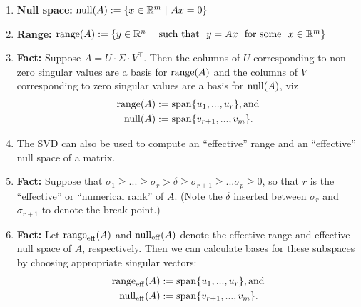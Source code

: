 \begin{tcolorbox}[title=\textbf{Other Interesting and Useful Facts}]
\begin{enumerate}
\setlength{\itemsep}{.2cm}
\renewcommand{\labelenumi}{(\alph{enumi})}

\item \textbf{Null space:} $\mathrm{null}(A):=\{ x\in \mathbb R^m~|~ Ax = 0\}$


\item \textbf{Range:} $\mathrm{range}(A):=\{ y\in \mathbb R^n~|~~\text{such that}~~ y = Ax~~\text{for some}~~x \in \mathbb R^m \}$


 \item \textbf{Fact:} Suppose $A = U \cdot \Sigma \cdot V^\top$. Then the columns of $U$ corresponding to non-zero singular values are a basis for $\mathrm{range}(A)$ and the columns of $V$ corresponding to zero singular values are a basis for $\mathrm{null}(A)$, viz
 \begin{align*}
    \mathrm{range}(A) &:= \mathrm{span} \{ u_1, ..., u_r \}, \text{and}\\
    \mathrm{null}(A) &:= \mathrm{span} \{ v_{r+1}, ..., v_m \}.
\end{align*}

\item The SVD can also be used to compute an ``effective'' range and an ``effective'' null space of a matrix.

\item \textbf{Fact:} Suppose that $\sigma_1 \geq ... \geq \sigma_r > \delta \ge  \sigma_{r+1} \geq ... \sigma_p \geq 0$, so that $r$ is the ``effective'' or ``numerical rank'' of $A$. (Note the $\delta$ inserted between $\sigma_r$ and $\sigma_{r+1}$ to denote the break point.)

\item \textbf{Fact:} Let $\mathrm{range}_{\rm eff}(A)$ and $\mathrm{null}_{\rm eff}(A)$ denote the effective range and effective null space of $A$, respectively. Then we can calculate bases for these subspaces by choosing appropriate singular vectors:
\begin{align*}
    \mathrm{range}_{\rm eff}(A) &:= \mathrm{span} \{ u_1, ..., u_r \}, \text{and}\\
    \mathrm{null}_{\rm eff}(A) &:= \mathrm{span} \{ v_{r+1}, ..., v_m \}.
\end{align*}

\end{enumerate}

\end{tcolorbox}


